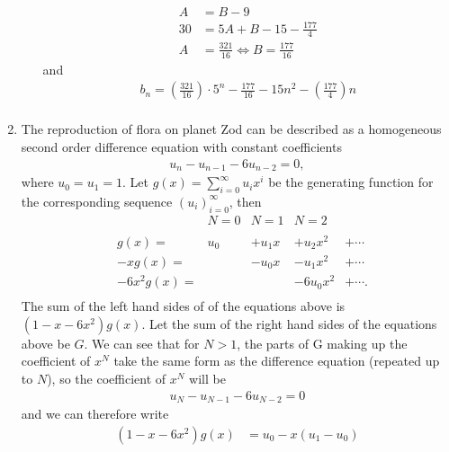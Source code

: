 \documentclass[10pt]{article}
\begin{document}
\begin{enumerate}
\begin{enumerate}
\begin{align*}
                    A &= B - 9 \\
                    30 &= 5A + B - 15 - \tfrac{177}{4} \\
                    A &= \tfrac{321}{16} \Leftrightarrow B = \tfrac{177}{16}
                \end{align*}
                and
                \begin{align*}
                    b_n = (\tfrac{321}{16})\cdot 5^n - \tfrac{177}{16} - 15n^2 - (\tfrac{177}{4})n \\
                \end{align*}
        \end{enumerate}
        \item The reproduction of flora on planet Zod can be described as a
            homogeneous second order difference equation with constant
            coefficients
            \begin{align*}
                u_n - u_{n - 1} - 6u_{n - 2} = 0,
            \end{align*}
            where $u_0 = u_1 = 1$. Let $g(x) = \sum_{i=0}^\infty u_ix^i$ be the
            generating function for the corresponding sequence
            $(u_i)_{i=0}^\infty$, then
            $$
            \begin{array}{rrllll}
                &       &N=0 &N=1 &N=2 \\
                \\
                &g(x) = &u_0 &+ u_1x &+ u_2x^2 &+ \cdots \\
                &-xg(x) =& &-u_0x &- u_1x^2 &+ \cdots \\
                &-6x^2g(x) =& &&-6u_0x^2 &+ \cdots .\\
            \end{array}
            $$
            The sum of the left hand sides of of the equations above is $(1 - x - 6x^2)g(x)$.
            Let the sum of the right hand sides of the equations above be $G$.
            We can see that for $N > 1$, the parts of G making up the coefficient of $x^N$
            take the same form as the difference equation (repeated up to $N$), so the coefficient of $x^N$
            will be 
            \begin{align*}
                u_N - u_{N - 1} - 6u_{N -2} = 0
            \end{align*}
            and we can therefore write
            \begin{align*}
                (1 - x - 6x^2)g(x) &= u_0 - x(u_1 - u_0)\\

\end{align*}
\end{enumerate}
\end{document}
